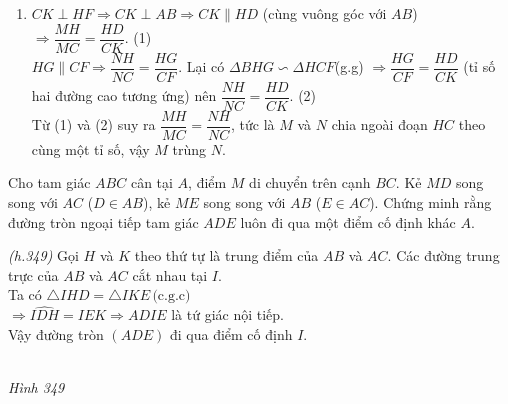 \begin{bt}
{\begin{enumerate}
	\item $CK \perp HF \Rightarrow CK \perp AB \Rightarrow CK \parallel HD$ (cùng vuông góc với $AB$) $\Rightarrow \dfrac{MH}{MC} = \dfrac{HD}{CK}$. \hfill(1)\\
	$HG \parallel CF \Rightarrow \dfrac{NH}{NC} = \dfrac{HG}{CF}$. Lại có $\Delta BHG \backsim \Delta HCF$(g.g) $\Rightarrow \dfrac{HG}{CF} = \dfrac{HD}{CK}$ (tỉ số hai đường cao tương ứng) nên $\dfrac{NH}{NC} = \dfrac{HD}{CK}$. \hfill(2)\\
	Từ (1) và (2) suy ra $\dfrac{MH}{MC} = \dfrac{NH}{NC}$, tức là $M$ và $N$ chia ngoài đoạn $HC$ theo cùng một tỉ số, vậy $M$ trùng $N$.
  \end{enumerate}
  }
\end{bt}

\begin{bt}%
 Cho tam giác $ABC$ cân tại $A$, điểm $M$ di chuyển trên cạnh $BC$. Kẻ $MD$ song song với $AC$ ($D\in AB$), kẻ $ME$ song song với $AB$ ($E\in AC$). Chứng minh rằng đường tròn ngoại tiếp tam giác $ADE$ luôn đi qua một điểm cố định khác $A$.
 \loigiai
  {
  \immini
  {
  \textit{(h.349)} Gọi $H$ và $K$ theo thứ tự là trung điểm của $AB$ và $AC$. Các đường trung trực của $AB$ và $AC$ cắt nhau tại $I$.\\ Ta có $\triangle IHD=\triangle IKE\,\text{(c.g.c)}$\\$\Rightarrow \widehat{IDH}=\widehat{IEK}\Rightarrow ADIE $ là tứ giác nội tiếp.\\ Vậy đường tròn $(ADE)$ đi qua điểm cố định $I$.	
  }
  {
  \\
  \centering\textit{Hình 349}
  }
  }
\end{bt}   

